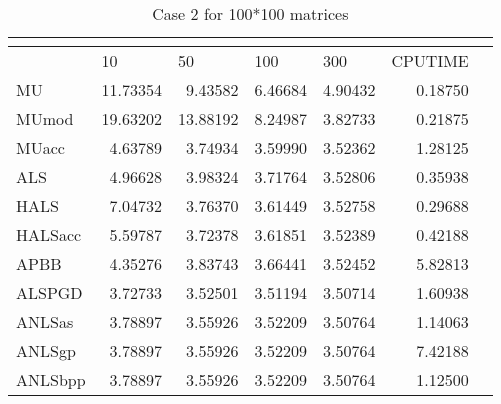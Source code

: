 \documentclass{article}
\begin{document}
\begin{table}[H]
		\caption{Case 2 for 100*100 matrices}
	\centering
	\begin{tabular}{|l|r|r|r|r|r|l|}
		\hline
		& \multicolumn{1}{l|}{}   & \multicolumn{1}{l|}{}   & \multicolumn{1}{l|}{}    & \multicolumn{1}{l|}{}    & \multicolumn{1}{l|}{}        &  \\ \hline
		& \multicolumn{1}{l|}{10} & \multicolumn{1}{l|}{50} & \multicolumn{1}{l|}{100} & \multicolumn{1}{l|}{300} & \multicolumn{1}{l|}{CPUTIME} &  \\ \hline
		MU       & 11.73354                & 9.43582                 & 6.46684                  & 4.90432                  & 0.18750                      &  \\ \hline
		MUmod    & 19.63202                & 13.88192                & 8.24987                  & 3.82733                  & 0.21875                      &  \\ \hline
		MUacc    & 4.63789                 & 3.74934                 & 3.59990                  & 3.52362                  & 1.28125                      &  \\ \hline
		ALS      & 4.96628                 & 3.98324                 & 3.71764                  & 3.52806                  & 0.35938                      &  \\ \hline
		HALS     & 7.04732                 & 3.76370                 & 3.61449                  & 3.52758                  & 0.29688                      &  \\ \hline
		HALSacc  & 5.59787                 & 3.72378                 & 3.61851                  & 3.52389                  & 0.42188                      &  \\ \hline
		APBB     & 4.35276                 & 3.83743                 & 3.66441                  & 3.52452                  & 5.82813                      &  \\ \hline
		ALSPGD   & 3.72733                 & 3.52501                 & 3.51194                  & 3.50714                  & 1.60938                      &  \\ \hline
		ANLSas   & 3.78897                 & 3.55926                 & 3.52209                  & 3.50764                  & 1.14063                      &  \\ \hline
		ANLSgp   & 3.78897                 & 3.55926                 & 3.52209                  & 3.50764                  & 7.42188                      &  \\ \hline
		ANLSbpp  & 3.78897                 & 3.55926                 & 3.52209                  & 3.50764                  & 1.12500                      &  \\ \hline

\end{tabular}
\end{table}
\end{document}
